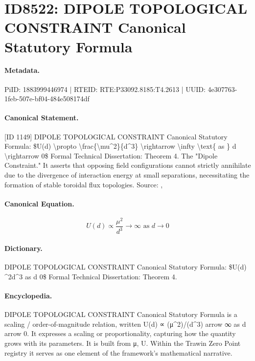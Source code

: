 \section*{ID8522: DIPOLE TOPOLOGICAL CONSTRAINT Canonical Statutory Formula}
\paragraph{Metadata.}
PiID: 1883999446974 | RTEID: RTE:P33092.8185:T4.2613 | UUID: 4e307763-1feb-507e-bf04-484e508174df

\paragraph{Canonical Statement.}
[ID 1149] DIPOLE TOPOLOGICAL CONSTRAINT Canonical Statutory Formula: \$U(d) \textbackslash{}propto \textbackslash{}frac\{\textbackslash{}mu\textasciicircum{}2\}\{d\textasciicircum{}3\} \textbackslash{}rightarrow \textbackslash{}infty \textbackslash{}text\{ as \} d \textbackslash{}rightarrow 0\$ Formal Technical Dissertation: Theorem 4. The "Dipole Constraint." It asserts that opposing field configurations cannot strictly annihilate due to the divergence of interaction energy at small separations, necessitating the formation of stable toroidal flux topologies. Source: ,

\paragraph{Canonical Equation.}
\[
U(d) \propto \frac{\mu^2}{d^3} \rightarrow \infty \text{ as } d \rightarrow 0
\]

\paragraph{Dictionary.}
DIPOLE TOPOLOGICAL CONSTRAINT Canonical Statutory Formula: \$U(d) \textasciicircum{}2d\textasciicircum{}3 as d 0\$ Formal Technical Dissertation: Theorem 4.

\paragraph{Encyclopedia.}
DIPOLE TOPOLOGICAL CONSTRAINT Canonical Statutory Formula is a scaling / order-of-magnitude relation, written U(d) ∝ (μ\textasciicircum{}2)/(d\textasciicircum{}3) arrow ∞ as d arrow 0. It expresses a scaling or proportionality, capturing how the quantity grows with its parameters. It is built from μ, U. Within the Trawin Zero Point registry it serves as one element of the framework's mathematical narrative.
